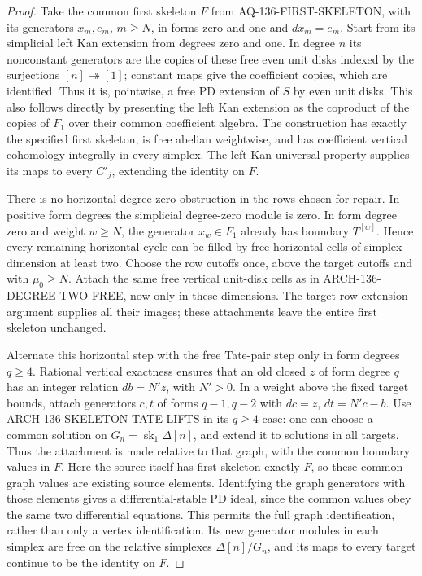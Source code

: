\begin{proof}
Take the common first skeleton \(F\) from
AQ-136-FIRST-SKELETON, with its generators \(x_m,e_m\),
\(m\geq N\), in forms zero and one and \(dx_m=e_m\).
Start from its simplicial left Kan extension from degrees
zero and one. In degree \(n\) its nonconstant generators
are the copies of these free even unit disks indexed by the
surjections \([n]\twoheadrightarrow[1]\); constant maps
give the coefficient copies, which are identified. Thus it
is, pointwise, a free PD extension of \(S\) by even unit
disks. This also follows directly by presenting the left Kan
extension as the coproduct of the copies of \(F_1\) over
their common coefficient algebra. The construction has exactly
the specified first skeleton, is free abelian weightwise,
and has coefficient vertical cohomology integrally in every
simplex. The left Kan universal property supplies its maps
to every \(C'_j\), extending the identity on \(F\).

There is no horizontal degree-zero obstruction in the rows
chosen for repair. In positive form degrees the simplicial
degree-zero module is zero. In form degree zero and weight
\(w\geq N\), the generator \(x_w\in F_1\) already has
boundary \(T^{[w]}\). Hence every remaining horizontal
cycle can be filled by free horizontal cells of simplex
dimension at least two. Choose the row cutoffs once, above
the target cutoffs and with \(\mu_0\geq N\). Attach the
same free vertical unit-disk cells as in
ARCH-136-DEGREE-TWO-FREE, now only in these dimensions.
The target row extension argument supplies all their images;
these attachments leave the entire first skeleton unchanged.

Alternate this horizontal step with the free Tate-pair step
only in form degrees \(q\geq4\). Rational vertical exactness
ensures that an old closed \(z\) of form degree \(q\) has
an integer relation \(db=N'z\), with \(N'>0\). In a weight
above the fixed target bounds, attach generators \(c,t\)
of forms \(q-1,q-2\) with \(dc=z\), \(dt=N'c-b\).
Use ARCH-136-SKELETON-TATE-LIFTS in its \(q\geq4\) case:
one can choose a common solution on
\(G_n=\operatorname{sk}_1\Delta[n]\), and extend it to
solutions in all targets. Thus the attachment is made relative
to that graph, with the common boundary values in \(F\).
Here the source itself has first skeleton exactly \(F\), so
these common graph values are existing source elements.
Identifying the graph generators with those elements gives
a differential-stable PD ideal, since the common values obey
the same two differential equations. This permits the full
graph identification, rather than only a vertex identification.
Its new generator modules in each simplex are free on the
relative simplexes \(\Delta[n]/G_n\), and its maps to every
target continue to be the identity on \(F\).


\end{proof}
